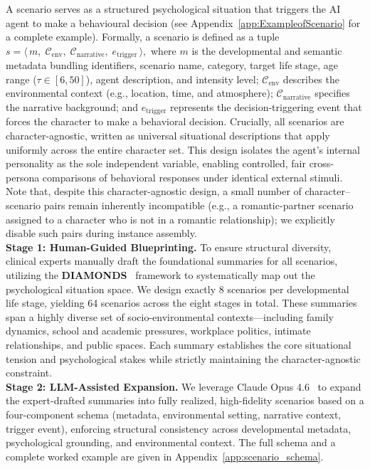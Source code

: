 \documentclass{article}
\begin{document}
A scenario serves as a structured psychological situation that triggers the AI agent to make a behavioural decision (see Appendix~\ref{app:ExampleofScenario} for a complete example). 
Formally, a scenario is defined as a tuple
  \(
  s = \bigl\langle\,
    m,\;
    \mathcal{C}_{\mathrm{env}},\; \mathcal{C}_{\mathrm{narrative}},\; e_{\mathrm{trigger}}
  \,\bigr\rangle,
  \)
where $m$ is the developmental and semantic metadata bundling identifiers, scenario name, category, target life stage, age range ($\tau \in [6,50]$), agent description, and intensity level; $\mathcal{C}_{\mathrm{env}}$ describes the environmental context (e.g., location, time, and atmosphere); $\mathcal{C}_{\mathrm{narrative}}$ specifies the narrative background; and $e_{\mathrm{trigger}}$ represents the decision-triggering event that forces the character to make a behavioral decision. Crucially, all scenarios are character-agnostic, written as universal situational descriptions that apply uniformly across the entire character set. This design isolates the agent's internal personality as the sole independent variable, enabling controlled, fair cross-persona comparisons of behavioral responses under identical external stimuli. Note that, despite this character-agnostic design, a small number of character--scenario pairs remain inherently incompatible (e.g., a romantic-partner scenario assigned to a character who is not in a romantic relationship); we explicitly disable such pairs during instance assembly.\\
\textbf{Stage 1: Human-Guided Blueprinting.} 
To ensure structural diversity, clinical experts manually draft the foundational summaries for all scenarios, utilizing the \textbf{DIAMONDS}~\cite{rauthmann2014diamonds} framework to systematically map out the psychological situation space. We design exactly 8 scenarios per developmental life stage, yielding 64 scenarios across the eight stages in total. These summaries span a highly diverse set of socio-environmental contexts—including family dynamics, school and academic pressures, workplace politics, intimate relationships, and public spaces. Each summary establishes the core situational tension and psychological stakes while strictly maintaining the character-agnostic constraint.\\
\textbf{Stage 2: LLM-Assisted Expansion.}
We leverage Claude Opus 4.6~\cite{anthropic2026opus46} to expand the expert-drafted summaries into fully realized, high-fidelity scenarios based on a four-component schema (metadata, environmental setting, narrative context, trigger event), enforcing structural consistency across developmental metadata, psychological grounding, and environmental context. The full schema and a complete worked example are given in Appendix~\ref{app:scenario_schema}.\\
\end{document}
